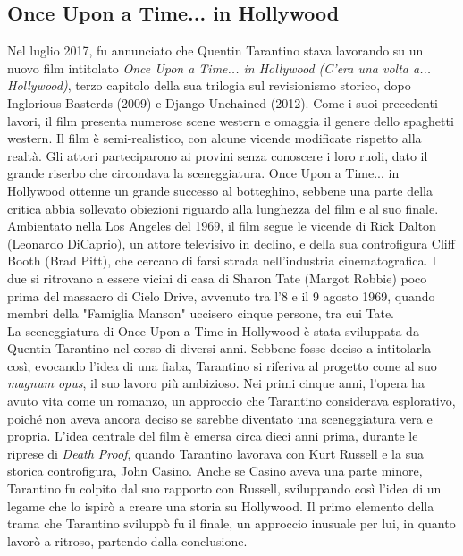 \documentclass[12pt]{article} %
\begin{document}
\subsection{Once Upon a Time... in Hollywood}
\begin{flushleft}
    Nel luglio 2017, fu annunciato che Quentin Tarantino stava lavorando su un nuovo film intitolato \textit{Once Upon a Time... in Hollywood (C'era una volta a... Hollywood)}, terzo capitolo della sua trilogia sul revisionismo storico, dopo Inglorious Basterds (2009) e Django Unchained (2012). Come i suoi precedenti lavori, il film presenta numerose scene western e omaggia il genere dello spaghetti western. 
    Il film è semi-realistico, con alcune vicende modificate rispetto alla realtà. Gli attori parteciparono ai provini senza conoscere i loro ruoli, dato il grande riserbo che circondava la sceneggiatura. Once Upon a Time... in Hollywood ottenne un grande successo al botteghino, sebbene una parte della critica abbia sollevato obiezioni riguardo alla lunghezza del film e al suo finale. 
    Ambientato nella Los Angeles del 1969, il film segue le vicende di Rick Dalton (Leonardo DiCaprio), un attore televisivo in declino, e della sua controfigura Cliff Booth (Brad Pitt), che cercano di farsi strada nell'industria cinematografica. I due si ritrovano a essere vicini di casa di Sharon Tate (Margot Robbie) poco prima del massacro di Cielo Drive, avvenuto tra l'8 e il 9 agosto 1969, quando membri della "Famiglia Manson" uccisero cinque persone, tra cui Tate. 
    \\\vspace{1cm}
    La sceneggiatura di Once Upon a Time in Hollywood è stata sviluppata da Quentin Tarantino nel corso di diversi anni. Sebbene fosse deciso a intitolarla così, evocando l'idea di una fiaba, Tarantino si riferiva al progetto come al suo \textit{magnum opus}, il suo lavoro più ambizioso. Nei primi cinque anni, l'opera ha avuto vita come un romanzo, un approccio che Tarantino considerava esplorativo, poiché non aveva ancora deciso se sarebbe diventato una sceneggiatura vera e propria. 
    L'idea centrale del film è emersa circa dieci anni prima, durante le riprese di \textit{Death Proof}, quando Tarantino lavorava con Kurt Russell e la sua storica controfigura, John Casino. 
    Anche se Casino aveva una parte minore, Tarantino fu colpito dal suo rapporto con Russell, sviluppando così l'idea di un legame che lo ispirò a creare una storia su Hollywood. 
    Il primo elemento della trama che Tarantino sviluppò fu il finale, un approccio inusuale per lui, in quanto lavorò a ritroso, partendo dalla conclusione. 

\end{flushleft}
\end{document}
